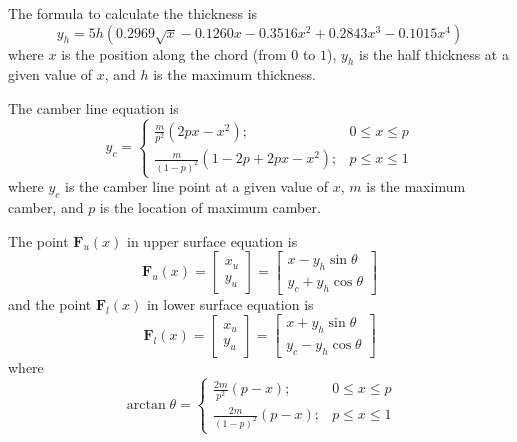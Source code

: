 The formula to calculate the thickness is
\begin{equation*}
    y_h = 5h\left( 0.2969\sqrt{x}-0.1260x-0.3516x^2+0.2843x^3-0.1015x^4 \right)
\end{equation*}
where $x$ is the position along the chord (from $0$ to $1$), $y_h$ is the half thickness at a given value of $x$, and
$h$ is the maximum thickness.

The camber line equation is
\begin{equation*}
    y_c =
    \begin{cases}
    \frac{m}{p^2} (2px-x^2); & 0 \leq x \leq p \\
    \frac{m}{(1-p)^2} (1-2p+2px-x^2);  &  p \leq x \leq 1
    \end{cases}
\end{equation*}
where $y_c$ is the camber line point at a given value of $x$, $m$ is the maximum camber, and $p$ is the location of
maximum camber.

The point $\mathbf{F}_u(x)$ in upper surface equation is
\begin{equation}
    \mathbf{F}_u(x) =
    \begin{bmatrix}
        x_u \\ y_u
    \end{bmatrix}
    =
    \begin{bmatrix}
        x - y_h \sin\theta \\ y_c + y_h \cos\theta
    \end{bmatrix}
    \label{e:naca:up_xy}
\end{equation}
and the point $\mathbf{F}_l(x)$ in lower surface equation is
\begin{equation*}
    \mathbf{F}_l(x) =
    \begin{bmatrix}
        x_u \\ y_u
    \end{bmatrix}
    =
    \begin{bmatrix}
        x + y_h \sin\theta \\ y_c - y_h \cos\theta
    \end{bmatrix}
\end{equation*}
where
\begin{equation*}
    \arctan \theta =
    \begin{cases}
    \frac{2m}{p^2} (p-x); & 0 \leq x \leq p \\
    \frac{2m}{(1-p)^2} (p-x);  &  p \leq x \leq 1
    \end{cases}
\end{equation*}